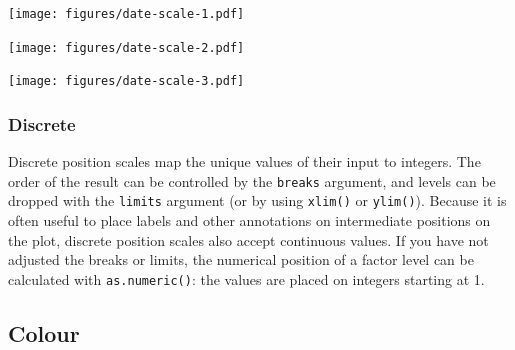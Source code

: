 \texttt{[image: figures/date-scale-1.pdf]}

\begin{Shaded}
\end{Shaded}

\texttt{[image: figures/date-scale-2.pdf]}

\begin{Shaded}
\end{Shaded}

\texttt{[image: figures/date-scale-3.pdf]}

\subsubsection{Discrete}\label{ssub:scale-discrete}

Discrete position scales map the unique values of their input to
integers. The order of the result can be controlled by the
\texttt{breaks} argument, and levels can be dropped with the
\texttt{limits} argument (or by using \texttt{xlim()} or
\texttt{ylim()}). Because it is often useful to place labels and other
annotations on intermediate positions on the plot, discrete position
scales also accept continuous values. If you have not adjusted the
breaks or limits, the numerical position of a factor level can be
calculated with \texttt{as.numeric()}: the values are placed on integers
starting at 1. 
 

\subsection{Colour}\label{sub:scale-colour}

